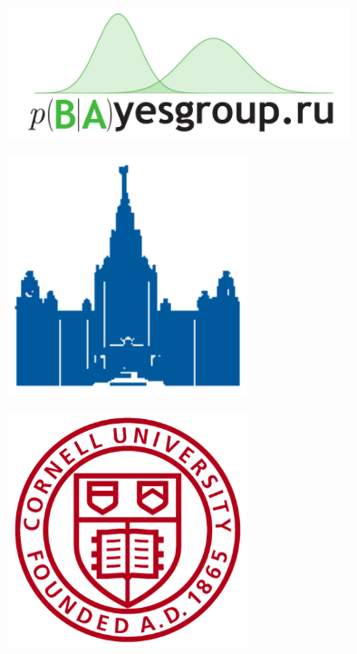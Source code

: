 \documentclass[a0,portrait]{a0poster}
\begin{document}
\begin{minipage}[b]{0.25\linewidth}
  \begin{minipage}[b]{0.49\linewidth}
  \begin{center}
    \centering
  \includegraphics[width=10cm]{pics/logos/bayesgroup.pdf}
  \vspace{0.5cm}
  \end{center}
  \end{minipage}
  \begin{minipage}[b]{0.49\linewidth}
  \begin{center}
    \centering
    \includegraphics[width=7cm]{pics/logos/msu_blue.eps}
  \end{center}
  \vspace{0.5cm}
  \end{minipage}
  \begin{minipage}[b]{0.49\linewidth}
  \begin{center}
    \centering
  \includegraphics[width=7cm]{pics/logos/cornell.png}

\end{center}
\end{minipage}
\end{minipage}
\end{document}
